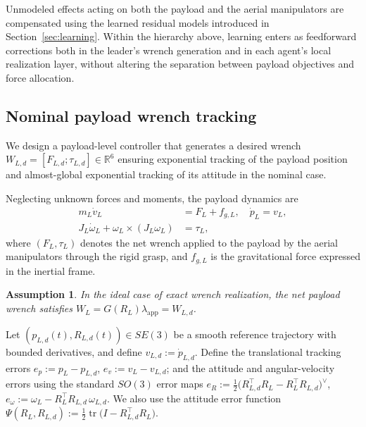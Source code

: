 \documentclass[letterpaper, 10 pt, conference]{ieeeconf}  %
\newcommand{\0}{\matr{0}}
\newtheorem{assumption}{Assumption}
\DeclareMathOperator{\tr}{tr}
\begin{document}
Unmodeled effects acting on both the payload and the aerial manipulators are compensated
using the learned residual models introduced in Section~\ref{sec:learning}.
Within the hierarchy above, learning enters as feedforward corrections
both in the leader's wrench generation and in each agent's local realization layer,
without altering the separation between payload objectives and force allocation.

\subsection{Nominal payload wrench tracking}
\label{subsec:payload_wrench_tracking}

We design a payload-level controller that generates a desired wrench
$W_{L,d}=[F_{L,d};\tau_{L,d}]\in\mathbb R^6$ ensuring exponential tracking of the payload position
and almost-global exponential tracking of its attitude in the nominal case.

Neglecting unknown forces and moments, the payload dynamics are
\begin{align}
m_L\dot v_L &= F_L + f_{g,L},\quad\dot p_L = v_L, \label{eq:pl_nom_kin}\\
J_L\dot\omega_L + \omega_L\times(J_L\omega_L) &= \tau_L,
\label{eq:pl_nom_rot}
\end{align}
where $(F_L,\tau_L)$ denotes the net wrench applied to the payload by the aerial
manipulators through the rigid grasp, and $f_{g,L}$ is the gravitational force
expressed in the inertial frame.

\begin{assumption}
\label{ass:wrench_matching_nominal}
In the ideal case of exact wrench realization, the net payload wrench satisfies
$W_L = G(R_L)\lambda_{\mathrm{app}} = W_{L,d}$.
\end{assumption}

Let $(p_{L,d}(t),R_{L,d}(t))\in SE(3)$ be a smooth reference trajectory with bounded
derivatives, and define $v_{L,d}:=\dot p_{L,d}$. Define the translational tracking errors
$e_p := p_L - p_{L,d}$,  $e_v := v_L - v_{L,d}$; and the attitude and angular-velocity errors using the standard $SO(3)$ error maps
$e_R := \frac{1}{2}\big(R_{L,d}^\top R_L - R_L^\top R_{L,d}\big)^\vee$, $e_\omega := \omega_L - R_L^\top R_{L,d}\,\omega_{L,d}$.
We also use the attitude error function
$\Psi(R_L,R_{L,d}) := \frac{1}{2}\tr\!\big(I - R_{L,d}^\top R_L\big)$.
\end{document}
